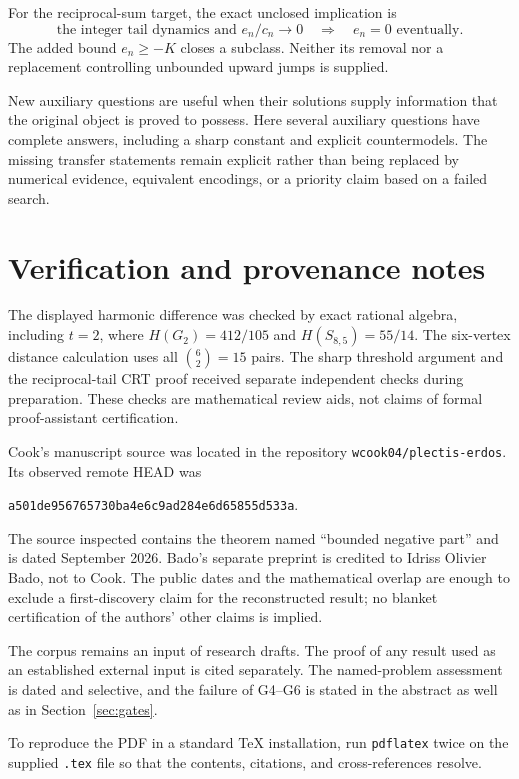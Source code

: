 \documentclass[11pt,a4paper]{article}
\theoremstyle{definition}
\theoremstyle{remark}\newtheorem{remark}[theorem]{Remark}
\begin{document}
For the reciprocal-sum target, the exact unclosed implication is
\[
 \text{the integer tail dynamics and }e_n/c_n\to0
 \quad\Longrightarrow\quad e_n=0\text{ eventually}.
\]
The added bound $e_n\ge-K$ closes a subclass. Neither its removal
nor a replacement controlling unbounded upward jumps is supplied.

New auxiliary questions are useful when their solutions supply
information that the original object is proved to possess.
Here several auxiliary questions have complete answers, including
a sharp constant and explicit countermodels. The missing transfer
statements remain explicit rather than being replaced by numerical
evidence, equivalent encodings, or a priority claim based on a
failed search.

\appendix
\section{Verification and provenance notes}

The displayed harmonic difference was checked by exact rational
algebra, including $t=2$, where
$H(G_2)=412/105$ and $H(S_{8,5})=55/14$.
The six-vertex distance calculation uses all $\binom62=15$ pairs.
The sharp threshold argument and the reciprocal-tail CRT proof
received separate independent checks during preparation.
These checks are mathematical review aids, not claims of formal
proof-assistant certification.

Cook's manuscript source was located in the repository
\texttt{wcook04/plectis-erdos}. Its observed remote HEAD was
\begin{center}\small
\texttt{a501de956765730ba4e6c9ad284e6d65855d533a}.
\end{center}
The source inspected contains the theorem named ``bounded negative
part'' and is dated September 2026. Bado's separate preprint is
credited to Idriss Olivier Bado, not to Cook. The public dates and
the mathematical overlap are enough to exclude a first-discovery
claim for the reconstructed result; no blanket certification of
the authors' other claims is implied.

The corpus remains an input of research drafts. The proof of any
result used as an established external input is cited separately.
The named-problem assessment is dated and selective, and the
failure of G4--G6 is stated in the abstract as well as in
Section~\ref{sec:gates}.

To reproduce the PDF in a standard TeX installation, run
\texttt{pdflatex} twice on the supplied \texttt{.tex} file so that
the contents, citations, and cross-references resolve.
\end{document}
